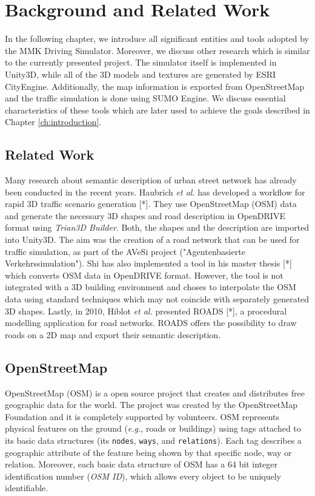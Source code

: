 \chapter{Background and Related Work}
\label{ch:background}
In the following chapter, we introduce all significant entities and tools adopted by the MMK Driving Simulator. Moreover, we discuss other research which is similar to the currently presented project. The simulator itself is implemented in Unity3D, while all of the 3D models and textures are generated by ESRI CityEngine. Additionally, the map information is exported from OpenStreetMap and the traffic simulation is done using SUMO Engine. We discuss essential characteristics of these tools which are later used to achieve the goals described in Chapter \ref{ch:introduction}. 

\section{Related Work}
Many research about semantic description of urban street network has already been conducted in the recent years. Haubrich \emph{et al.} has developed a workflow for rapid 3D traffic scenario generation [*]. They use OpenStreetMap (OSM) data and generate the necessary 3D shapes and road description in OpenDRIVE format using \emph{Trian3D Builder}. Both, the shapes and the description are imported into Unity3D. The aim was the creation of a road network that can be used for traffic simulation, as part of the AVeSi project ("Agentenbasierte Verkehrssimulation"). Shi has also implemented a tool in his master thesis [*] which converts OSM data in OpenDRIVE format. However, the tool is not integrated with a 3D building environment and choses to interpolate the OSM data using standard techniques which may not coincide with separately generated 3D shapes. Lastly, in 2010, Hiblot \emph{et al.} presented ROADS [*], a procedural modelling application for road networks. ROADS offers the possibility to draw roads on a 2D map and export their semantic description.  

\section{OpenStreetMap}
\label{ch:osm}
OpenStreetMap (OSM) is a open source project that creates and distributes free geographic data for the world. The project was created by the OpenStreetMap Foundation and it is completely supported by volunteers. OSM represents physical features on the ground (\emph{e.g.}, roads or buildings) using tags attached to its basic data structures (its \texttt{nodes}, \texttt{ways}, and \texttt{relations}). Each tag describes a geographic attribute of the feature being shown by that specific node, way or relation. Moreover, each basic data structure of OSM has a 64 bit integer identification number (\emph{OSM ID}), which allows every object to be uniquely identifiable.

